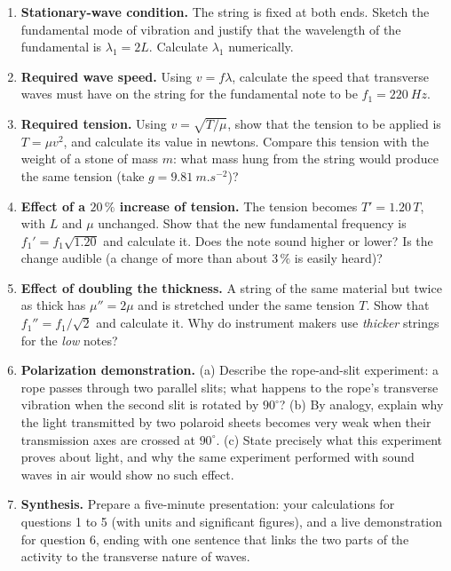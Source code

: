 \documentclass[11pt]{article}
\newcounter{popsec}
\newcounter{popsub}
\newcommand{\courssub}[1]{%
  \stepcounter{popsub}%
  \par\vspace{9pt}\noindent{\popxbold\fontsize{11.5}{13}\selectfont\color{popink}{\color{poporange}\thepopsec.\thepopsub}\hspace{6pt}#1}\par\nopagebreak\vspace{4pt}
}
\begin{document}
\begin{enumerate}
\item \textbf{Stationary-wave condition.} The string is fixed at both ends. Sketch the fundamental mode of vibration and justify that the wavelength of the fundamental is $\lambda_1=2L$. Calculate $\lambda_1$ numerically.
\item \textbf{Required wave speed.} Using $v=f\lambda$, calculate the speed that transverse waves must have on the string for the fundamental note to be $f_1=\SI{220}{Hz}$.
\item \textbf{Required tension.} Using $v=\sqrt{T/\mu}$, show that the tension to be applied is $T=\mu v^{2}$, and calculate its value in newtons. Compare this tension with the weight of a stone of mass $m$: what mass hung from the string would produce the same tension (take $g=\SI{9.81}{m.s^{-2}}$)?
\item \textbf{Effect of a $20\,\%$ increase of tension.} The tension becomes $T'=1.20\,T$, with $L$ and $\mu$ unchanged. Show that the new fundamental frequency is $f_1'=f_1\sqrt{1.20}$ and calculate it. Does the note sound higher or lower? Is the change audible (a change of more than about $3\,\%$ is easily heard)?
\item \textbf{Effect of doubling the thickness.} A string of the same material but twice as thick has $\mu''=2\mu$ and is stretched under the same tension $T$. Show that $f_1''=f_1/\sqrt{2}$ and calculate it. Why do instrument makers use \emph{thicker} strings for the \emph{low} notes?
\item \textbf{Polarization demonstration.} (a) Describe the rope-and-slit experiment: a rope passes through two parallel slits; what happens to the rope's transverse vibration when the second slit is rotated by $90^{\circ}$? (b) By analogy, explain why the light transmitted by two polaroid sheets becomes very weak when their transmission axes are crossed at $90^{\circ}$. (c) State precisely what this experiment proves about light, and why the same experiment performed with sound waves in air would show no such effect.
\item \textbf{Synthesis.} Prepare a five-minute presentation: your calculations for questions 1 to 5 (with units and significant figures), and a live demonstration for question 6, ending with one sentence that links the two parts of the activity to the transverse nature of waves.
\end{enumerate}

\courssub{Model answer}
\end{document}
